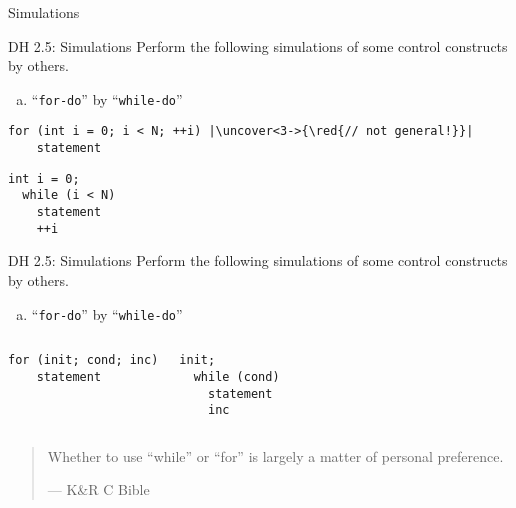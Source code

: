 \begin{frame}{}
  \centerline{\LARGE Simulations}
\end{frame}

\begin{frame}[fragile]{}
  \begin{exampleblock}{DH 2.5: Simulations}
    Perform the following simulations of some control constructs by others.
    \begin{enumerate}[(a)]
      \item ``\texttt{for-do}'' by ``\texttt{while-do}''
    \end{enumerate}
  \end{exampleblock}

  \vspace{0.40cm}
  \pause
  \begin{lstlisting}[style = Cstyle, backgroundcolor = \color{teal!10!lightgray}]
  for (int i = 0; i < N; ++i) |\uncover<3->{\red{// not general!}}|
    statement
  \end{lstlisting}

  \vspace{0.20cm}
  \begin{lstlisting}[style = Cstyle]
  int i = 0;
  while (i < N)
    statement
    ++i
  \end{lstlisting}
\end{frame}
\begin{frame}[fragile]{}
  \begin{exampleblock}{DH 2.5: Simulations}
    Perform the following simulations of some control constructs by others.
    \begin{enumerate}[(a)]
      \item ``\texttt{for-do}'' by ``\texttt{while-do}''
    \end{enumerate}
  \end{exampleblock}

  \begin{columns}
      \begin{lstlisting}[style = Cstyle, backgroundcolor = \color{teal!10!lightgray}]
  for (init; cond; inc)
    statement
      \end{lstlisting}
      \begin{lstlisting}[style = Cstyle]
  init;
  while (cond)
    statement
    inc
      \end{lstlisting}
  \end{columns}

  \vspace{0.50cm}
  \pause
  \begin{quote}
    Whether to use ``while'' or ``for'' is largely a matter of personal preference.
     
    \hfill --- K\&R C Bible
  \end{quote}
\end{frame}

